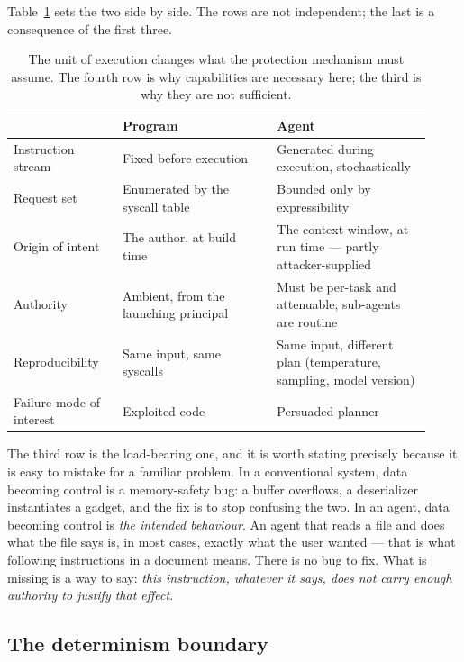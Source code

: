 \documentclass[11pt]{article}
\begin{document}
Table~\ref{tab:program-vs-agent} sets the two side by side. The rows are not
independent; the last is a consequence of the first three.

\begin{table}[t]
\centering
\small
\begin{tabular}{@{}p{0.24\linewidth}p{0.34\linewidth}p{0.34\linewidth}@{}}
\toprule
& \textbf{Program} & \textbf{Agent} \\
\midrule
Instruction stream & Fixed before execution & Generated during execution, stochastically \\
Request set & Enumerated by the syscall table & Bounded only by expressibility \\
Origin of intent & The author, at build time & The context window, at run time --- partly attacker-supplied \\
Authority & Ambient, from the launching principal & Must be per-task and attenuable; sub-agents are routine \\
Reproducibility & Same input, same syscalls & Same input, different plan (temperature, sampling, model version) \\
Failure mode of interest & Exploited code & Persuaded planner \\
\bottomrule
\end{tabular}
\caption{The unit of execution changes what the protection mechanism must
assume. The fourth row is why capabilities are necessary here; the third is
why they are not sufficient.}
\label{tab:program-vs-agent}
\end{table}

The third row is the load-bearing one, and it is worth stating precisely
because it is easy to mistake for a familiar problem. In a conventional
system, data becoming control is a memory-safety bug: a buffer overflows, a
deserializer instantiates a gadget, and the fix is to stop confusing the two.
In an agent, data becoming control is \emph{the intended behaviour}. An agent
that reads a file and does what the file says is, in most cases, exactly what
the user wanted --- that is what following instructions in a document means.
There is no bug to fix. What is missing is a way to say: \emph{this
instruction, whatever it says, does not carry enough authority to justify that
effect}.

\subsection{The determinism boundary}
\end{document}
